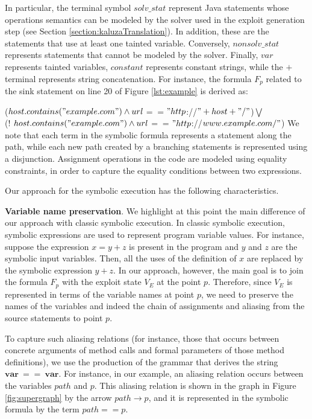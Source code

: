 In particular, the terminal symbol $solv\_stat$ represent Java statements whose operations semantics can be modeled by the solver used in the exploit generation step (see Section \ref{section:kaluzaTranslation}). In addition, these are the statements that use at least one tainted variable. Conversely, $nonsolv\_stat$ represents statements that cannot be modeled by the solver. Finally, $var$ represents tainted variables, $constant$ represents constant strings, while the $+$ terminal represents string concatenation. For instance, the formula $F_p$ related to the sink statement on line 20 of Figure \ref{lst:example} is derived as:

\scriptsize
($host.contains("example.com") \wedge url$$==$$"http$://$"+host+"/"$)$\bigvee$ \\
(! $host.contains("example.com") \wedge url$$==$$"http$://$www.example.com/"$)
\normalsize
We note that each term in the symbolic formula represents a statement along the path, while each new path created by a branching statements is represented using a disjunction. Assignment operations in the code are modeled using equality constraints, in order to capture the equality conditions between two expressions. 

Our approach for the symbolic execution has the following characteristics.

\noindent
\textbf{Variable name preservation}. We highlight at this point the main difference of our approach with classic symbolic execution. In classic symbolic execution, symbolic expressions are used to represent program variable values. For instance, suppose the expression $x=y+z$ is present in the program and $y$ and $z$ are the symbolic input variables. Then, all the uses of the definition of $x$ are replaced by the symbolic expression $y+z$. In our approach, however, the main goal is to join the formula $F_p$ with the exploit state $V_E$ at the point $p$. Therefore, since $V_E$ is represented in terms of the variable names at point $p$, we need to preserve the names of the variables and indeed the chain of assignments and aliasing from the source statements to point $p$. 

To capture such aliasing relations (for instance, those that occurs between concrete arguments of method calls and formal parameters of those method definitions), we use the production of the grammar that derives the string $\boldsymbol{var}\ ==\ \boldsymbol{var}$. For instance, in our example, an aliasing relation occurs between the variables $path$ and $p$. This aliasing relation is shown in the graph in Figure \ref{fig:supergraph} by the arrow $path \rightarrow p$, and it is represented in the symbolic formula by the term $path == p$. 

